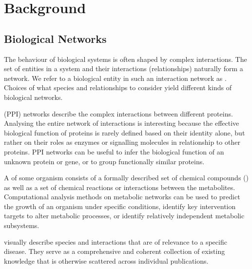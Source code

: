 \documentclass[
	fontsize=10pt, %
	twoside=false, %
	secnumdepth=1, %
  toc=indentunnumbered %
]{kaobook}
\begin{document}
\chapter{Background}

\section{Biological Networks}

The behaviour of biological systems is often shaped by complex interactions.
%
%
%
The set of entities in a system and their interactions (relationships) naturally
form a network. We refer to a biological entity in such an interaction network
as . Choices of what species and relationships to consider yield
different kinds of biological networks.

 (PPI) networks describe the complex
interactions between different proteins. Analysing the entire network of
interactions is interesting because the effective biological function of
proteins is rarely defined based on their identity alone, but rather on their
roles as enzymes or signalling molecules in relationship to other proteins.
\textsc{PPI} networks can be useful to infer the biological function of an
unknown protein or gene, or to group functionally similar proteins.

A  of some organism consists of a formally described set of
chemical compounds () as well as a set of chemical reactions or
interactions between the metabolites. Computational analysis methods on
metabolic networks can be used to predict the growth of an organism under
specific conditions, identify key intervention targets to alter metabolic
processes, or identify relatively independent metabolic subsystems.

 visually describe species and interactions that are of relevance
to a specific disease. They serve as a comprehensive and coherent collection of
existing knowledge that is otherwise scattered across individual publications.
\end{document}
